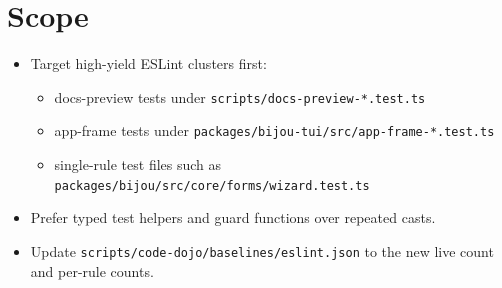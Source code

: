 \section{Scope}\label{record-216-scope}

\begin{itemize}
\tightlist
\item
  Target high-yield ESLint clusters first:

  \begin{itemize}
  \tightlist
  \item
    docs-preview tests under \texttt{s\allowbreak{}c\allowbreak{}r\allowbreak{}i\allowbreak{}p\allowbreak{}t\allowbreak{}s\allowbreak{}/\allowbreak{}d\allowbreak{}o\allowbreak{}c\allowbreak{}s\allowbreak{}-\allowbreak{}p\allowbreak{}r\allowbreak{}e\allowbreak{}v\allowbreak{}i\allowbreak{}e\allowbreak{}w\allowbreak{}-\allowbreak{}*\allowbreak{}.\allowbreak{}t\allowbreak{}e\allowbreak{}s\allowbreak{}t\allowbreak{}.\allowbreak{}t\allowbreak{}s}
  \item
    app-frame tests under \texttt{p\allowbreak{}a\allowbreak{}c\allowbreak{}k\allowbreak{}a\allowbreak{}g\allowbreak{}e\allowbreak{}s\allowbreak{}/\allowbreak{}b\allowbreak{}i\allowbreak{}j\allowbreak{}o\allowbreak{}u\allowbreak{}-\allowbreak{}t\allowbreak{}u\allowbreak{}i\allowbreak{}/\allowbreak{}s\allowbreak{}r\allowbreak{}c\allowbreak{}/\allowbreak{}a\allowbreak{}p\allowbreak{}p\allowbreak{}-\allowbreak{}f\allowbreak{}r\allowbreak{}a\allowbreak{}m\allowbreak{}e\allowbreak{}-\allowbreak{}*\allowbreak{}.\allowbreak{}t\allowbreak{}e\allowbreak{}s\allowbreak{}t\allowbreak{}.\allowbreak{}t\allowbreak{}s}
  \item
    single-rule test files such as \texttt{p\allowbreak{}a\allowbreak{}c\allowbreak{}k\allowbreak{}a\allowbreak{}g\allowbreak{}e\allowbreak{}s\allowbreak{}/\allowbreak{}b\allowbreak{}i\allowbreak{}j\allowbreak{}o\allowbreak{}u\allowbreak{}/\allowbreak{}s\allowbreak{}r\allowbreak{}c\allowbreak{}/\allowbreak{}c\allowbreak{}o\allowbreak{}r\allowbreak{}e\allowbreak{}/\allowbreak{}f\allowbreak{}o\allowbreak{}r\allowbreak{}m\allowbreak{}s\allowbreak{}/\allowbreak{}w\allowbreak{}i\allowbreak{}z\allowbreak{}a\allowbreak{}r\allowbreak{}d\allowbreak{}.\allowbreak{}t\allowbreak{}e\allowbreak{}s\allowbreak{}t\allowbreak{}.\allowbreak{}t\allowbreak{}s}
  \end{itemize}
\item
  Prefer typed test helpers and guard functions over repeated casts.
\item
  Update \texttt{s\allowbreak{}c\allowbreak{}r\allowbreak{}i\allowbreak{}p\allowbreak{}t\allowbreak{}s\allowbreak{}/\allowbreak{}c\allowbreak{}o\allowbreak{}d\allowbreak{}e\allowbreak{}-\allowbreak{}d\allowbreak{}o\allowbreak{}j\allowbreak{}o\allowbreak{}/\allowbreak{}b\allowbreak{}a\allowbreak{}s\allowbreak{}e\allowbreak{}l\allowbreak{}i\allowbreak{}n\allowbreak{}e\allowbreak{}s\allowbreak{}/\allowbreak{}e\allowbreak{}s\allowbreak{}l\allowbreak{}i\allowbreak{}n\allowbreak{}t\allowbreak{}.\allowbreak{}j\allowbreak{}s\allowbreak{}o\allowbreak{}n} to the new live count and per-rule counts.

\end{itemize}
